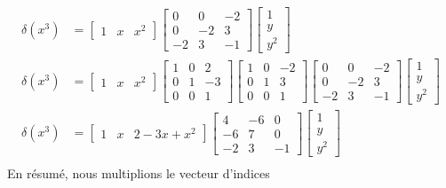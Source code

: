 \documentclass{standalone}
\begin{document}
\begin{align} \nonumber %
	\delta(x^3) &=
	\begin{bmatrix}
			1 & x & x^2
	\end{bmatrix}
	\begin{bmatrix}
		0 & 0 & -2 \\
		0 & -2 & 3 \\
		-2 & 3 & -1
	\end{bmatrix}
	\begin{bmatrix}
		1 \\
		y \\
		y^2
	\end{bmatrix} \\ \nonumber %
	\delta(x^3) &=
	\begin{bmatrix}
		1 & x & x^2
	\end{bmatrix}
	\begin{bmatrix}
		1 & 0 & 2 \\
		0 & 1 & -3 \\
		0 & 0 & 1
	\end{bmatrix}
	\begin{bmatrix}
		1 & 0 & -2 \\
		0 & 1 & 3 \\
		0 & 0 & 1
	\end{bmatrix}
	\begin{bmatrix}
		0 & 0 & -2 \\
		0 & -2 & 3 \\
		-2 & 3 & -1
	\end{bmatrix}
	\begin{bmatrix}
		1 \\
		y \\
		y^2
	\end{bmatrix} \\ \nonumber %
	\delta(x^3) &=
	\begin{bmatrix}
			1 & x & 2 - 3x + x^2
	\end{bmatrix}
	\begin{bmatrix}
		4 & -6 & 0 \\
		-6 & 7 & 0 \\
		-2 & 3 & -1
	\end{bmatrix}
	\begin{bmatrix}
		1 \\
		y \\
		y^2
	\end{bmatrix} \\ \nonumber %
\end{align}
En résumé, nous multiplions le vecteur d'indices
\end{document}
